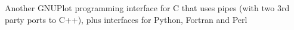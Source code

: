 \documentclass[11pt]{article}
\begin{document}
Another GNUPlot programming interface for C that uses pipes (with two 3rd party ports to C++), plus interfaces for Python, Fortran and Perl












%
%
%
%

%


 
\end{document}
